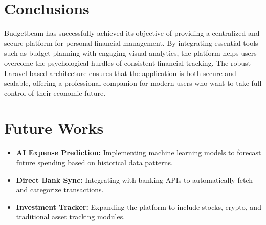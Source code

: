 \chapter{Conclusions}
Budgetbeam has successfully achieved its objective of providing a centralized and secure platform for personal financial management. By integrating essential tools such as budget planning with engaging visual analytics, the platform helps users overcome the psychological hurdles of consistent financial tracking. The robust Laravel-based architecture ensures that the application is both secure and scalable, offering a professional companion for modern users who want to take full control of their economic future.

\chapter{Future Works}
\begin{itemize}
    \item \textbf{AI Expense Prediction:} Implementing machine learning models to forecast future spending based on historical data patterns.
    \item \textbf{Direct Bank Sync:} Integrating with banking APIs to automatically fetch and categorize transactions.
    \item \textbf{Investment Tracker:} Expanding the platform to include stocks, crypto, and traditional asset tracking modules.
\end{itemize}
